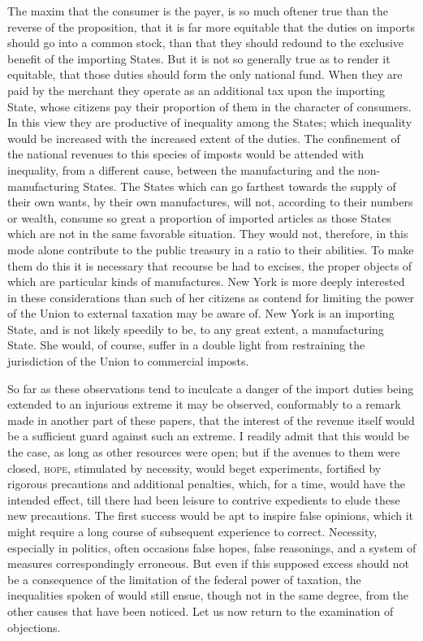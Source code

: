 The maxim that the consumer is the payer, is so much oftener true than the reverse of the proposition, that it is far more equitable that the duties on imports should go into a common stock, than that they should redound to the exclusive benefit of the importing States. 
But it is not so generally true as to render it equitable, that those duties should form the only national fund. 
When they are paid by the merchant they operate as an additional tax upon the importing State, whose citizens pay their proportion of them in the character of consumers. 
In this view they are productive of inequality among the States; which inequality would be increased with the increased extent of the duties. 
The confinement of the national revenues to this species of imposts would be attended with inequality, from a different cause, between the manufacturing and the non-manufacturing States. 
The States which can go farthest towards the supply of their own wants, by their own manufactures, will not, according to their numbers or wealth, consume so great a proportion of imported articles as those States which are not in the same favorable situation. 
They would not, therefore, in this mode alone contribute to the public treasury in a ratio to their abilities. 
To make them do this it is necessary that recourse be had to excises, the proper objects of which are particular kinds of manufactures. 
New York is more deeply interested in these considerations than such of her citizens as contend for limiting the power of the Union to external taxation may be aware of. 
New York is an importing State, and is not likely speedily to be, to any great extent, a manufacturing State. 
She would, of course, suffer in a double light from restraining the jurisdiction of the Union to commercial imposts.

So far as these observations tend to inculcate a danger of the import duties being extended to an injurious extreme it may be observed, conformably to a remark made in another part of these papers, that the interest of the revenue itself would be a sufficient guard against such an extreme. 
I readily admit that this would be the case, as long as other resources were open; but if the avenues to them were closed, \textsc{hope}, stimulated by necessity, would beget experiments, fortified by rigorous precautions and additional penalties, which, for a time, would have the intended effect, till there had been leisure to contrive expedients to elude these new precautions. 
The first success would be apt to inspire false opinions, which it might require a long course of subsequent experience to correct. 
Necessity, especially in politics, often occasions false hopes, false reasonings, and a system of measures correspondingly erroneous. 
But even if this supposed excess should not be a consequence of the limitation of the federal power of taxation, the inequalities spoken of would still ensue, though not in the same degree, from the other causes that have been noticed. 
Let us now return to the examination of objections.

